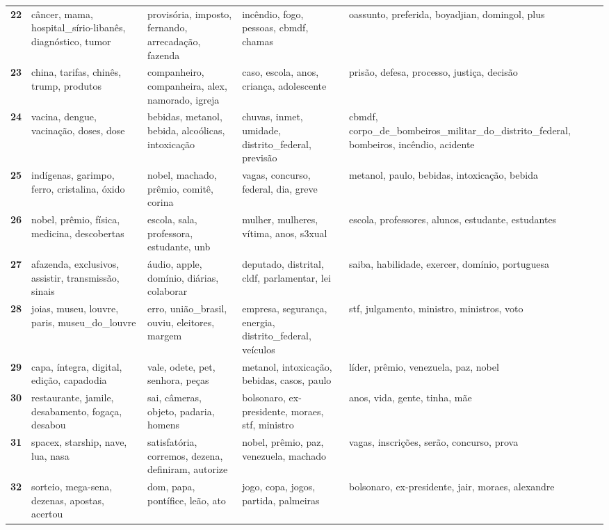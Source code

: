 \begin{xltabular}{\textwidth}{@{}l >{\RaggedRight\arraybackslash}X >{\RaggedRight\arraybackslash}X >{\RaggedRight\arraybackslash}X >{\RaggedRight\arraybackslash}X@{}}
    \textbf{22} & câncer, mama, hospital\_sírio-libanês, diagnóstico, tumor & provisória, imposto, fernando, arrecadação, fazenda & incêndio, fogo, pessoas, cbmdf, chamas & oassunto, preferida, boyadjian, domingol, plus \\
    \textbf{23} & china, tarifas, chinês, trump, produtos & companheiro, companheira, alex, namorado, igreja & caso, escola, anos, criança, adolescente & prisão, defesa, processo, justiça, decisão \\
    \textbf{24} & vacina, dengue, vacinação, doses, dose & bebidas, metanol, bebida, alcoólicas, intoxicação & chuvas, inmet, umidade, distrito\_federal, previsão & cbmdf, corpo\_de\_bombeiros\_militar\_do\_distrito\_federal, bombeiros, incêndio, acidente \\
    \textbf{25} & indígenas, garimpo, ferro, cristalina, óxido & nobel, machado, prêmio, comitê, corina & vagas, concurso, federal, dia, greve & metanol, paulo, bebidas, intoxicação, bebida \\
    \textbf{26} & nobel, prêmio, física, medicina, descobertas & escola, sala, professora, estudante, unb & mulher, mulheres, vítima, anos, s3xual & escola, professores, alunos, estudante, estudantes \\
    \textbf{27} & afazenda, exclusivos, assistir, transmissão, sinais & áudio, apple, domínio, diárias, colaborar & deputado, distrital, cldf, parlamentar, lei & saiba, habilidade, exercer, domínio, portuguesa \\
    \textbf{28} & joias, museu, louvre, paris, museu\_do\_louvre & erro, união\_brasil, ouviu, eleitores, margem & empresa, segurança, energia, distrito\_federal, veículos & stf, julgamento, ministro, ministros, voto \\
    \textbf{29} & capa, íntegra, digital, edição, capadodia & vale, odete, pet, senhora, peças & metanol, intoxicação, bebidas, casos, paulo & líder, prêmio, venezuela, paz, nobel \\
    \textbf{30} & restaurante, jamile, desabamento, fogaça, desabou & sai, câmeras, objeto, padaria, homens & bolsonaro, ex-presidente, moraes, stf, ministro & anos, vida, gente, tinha, mãe \\
    \textbf{31} & spacex, starship, nave, lua, nasa & satisfatória, corremos, dezena, definiram, autorize & nobel, prêmio, paz, venezuela, machado & vagas, inscrições, serão, concurso, prova \\
    \textbf{32} & sorteio, mega-sena, dezenas, apostas, acertou & dom, papa, pontífice, leão, ato & jogo, copa, jogos, partida, palmeiras & bolsonaro, ex-presidente, jair, moraes, alexandre \\

\end{xltabular}
